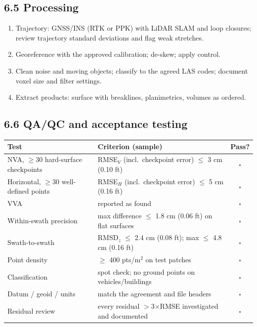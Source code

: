 \subsection*{6.5 Processing}
\begin{enumerate}[label=\alph*.]
\item Trajectory: GNSS/INS (RTK or PPK) with LiDAR SLAM and loop closures; review trajectory standard deviations and flag weak stretches.
\item Georeference with the approved calibration; de-skew; apply control.
\item Clean noise and moving objects; classify to the agreed LAS codes; document voxel size and filter settings.
\item Extract products: surface with breaklines, planimetrics, volumes as ordered.
\end{enumerate}

\subsection*{6.6 QA/QC and acceptance testing}
\begin{center}\small
\renewcommand{\arraystretch}{1.2}
\begin{tabularx}{\linewidth}{>{\raggedright\arraybackslash}p{4.2cm}Xc}\toprule
\textbf{Test} & \textbf{Criterion (sample)} & \textbf{Pass?}\\\midrule
NVA, $\ge$30 hard-surface checkpoints & RMSE$_V$ (incl.\ checkpoint error) $\le$ 3 cm (0.10 ft) & $\square$\\
Horizontal, $\ge$30 well-defined points & RMSE$_H$ (incl.\ checkpoint error) $\le$ 5 cm (0.16 ft) & $\square$\\
VVA & reported as found & $\square$\\
Within-swath precision & max difference $\le$ 1.8 cm (0.06 ft) on flat surfaces & $\square$\\
Swath-to-swath & RMSD$_z$ $\le$ 2.4 cm (0.08 ft); max $\le$ 4.8 cm (0.16 ft) & $\square$\\
Point density & $\ge$ 400 pts/m$^2$ on test patches & $\square$\\
Classification & spot check; no ground points on vehicles/buildings & $\square$\\
Datum / geoid / units & match the agreement and file headers & $\square$\\
Residual review & every residual $>$3$\times$RMSE investigated and documented & $\square$\\\bottomrule
\end{tabularx}\end{center}

